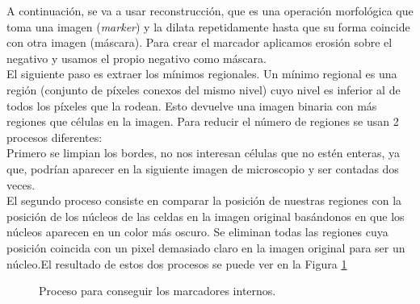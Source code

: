 A continuación, se va a usar reconstrucción, que es una operación morfológica que toma una imagen (\emph{marker}) y la dilata repetidamente hasta que su forma coincide con otra imagen (máscara). Para crear el marcador aplicamos erosión sobre el negativo y usamos el propio negativo como máscara.\\ 

El siguiente paso es extraer los mínimos regionales. Un mínimo regional es una región (conjunto de píxeles conexos del mismo nivel) cuyo nivel es inferior al de todos los píxeles que la rodean. Esto devuelve una imagen binaria con más regiones que células en la imagen. Para reducir el número de regiones se usan 2 procesos diferentes:\\

Primero se limpian los bordes, no nos interesan células que no estén enteras, ya que, podrían aparecer en la siguiente imagen de microscopio y ser contadas dos veces.\\

El segundo proceso consiste en comparar la posición de nuestras regiones con la posición de los núcleos de las celdas en la imagen original basándonos en que los núcleos aparecen en un color más oscuro. Se eliminan todas las regiones cuya posición coincida con un pixel demasiado claro en la imagen original para ser un núcleo.El resultado de estos dos procesos se puede ver en la Figura \ref{procesos}

\begin{figure}[!tbp]
  \centering
  \hfill
  \caption{Proceso para conseguir los marcadores internos.}
  \label{procesos}
\end{figure}

